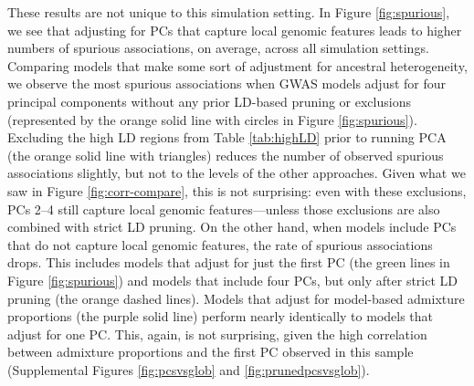 \documentclass[12pt]{article}
\begin{document}
These results are not unique to this simulation setting. 
In Figure \ref{fig:spurious}, we see that adjusting for PCs that capture local genomic features leads to higher numbers of spurious associations, on average, across all simulation settings.
Comparing models that make some sort of adjustment for ancestral heterogeneity, we observe the most spurious associations when GWAS models adjust for four principal components without any prior LD-based pruning or exclusions (represented by the orange solid line with circles in Figure \ref{fig:spurious}).
Excluding the high LD regions from Table \ref{tab:highLD} prior to running PCA (the orange solid line with triangles) reduces the number of observed spurious associations slightly, but not to the levels of the other approaches.
Given what we saw in Figure \ref{fig:corr-compare}, this is not surprising: even with these exclusions, PCs 2--4 still capture local genomic features---unless those exclusions are also combined with strict LD pruning.
On the other hand, when models include PCs that do not capture local genomic features, the rate of spurious associations drops. 
This includes models that adjust for just the first PC (the green lines in Figure \ref{fig:spurious}) and models that include four PCs, but only after strict LD pruning (the orange dashed lines).
Models that adjust for model-based admixture proportions (the purple solid line) perform nearly identically to models that adjust for one PC.
This, again, is not surprising, given the high correlation between admixture proportions and the first PC observed in this sample (Supplemental Figures \ref{fig:pcsvsglob} and \ref{fig:prunedpcsvsglob}).
\end{document}
